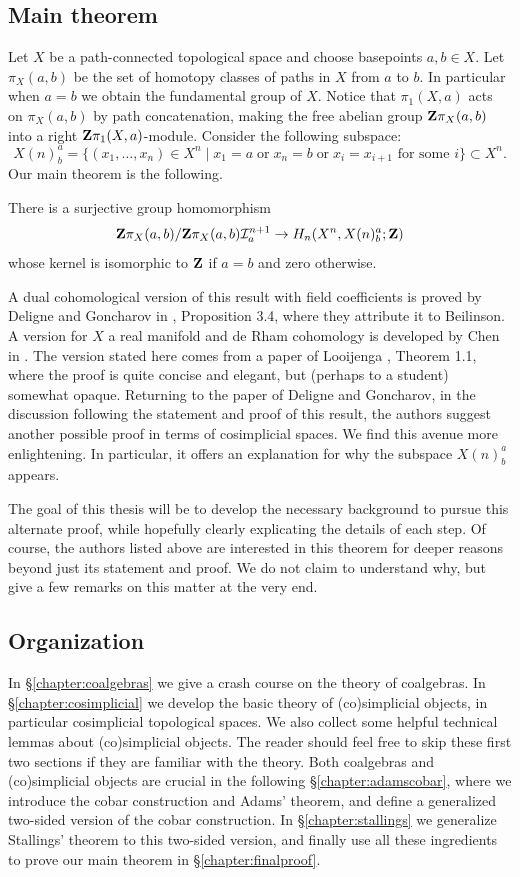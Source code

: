 \subsection{Main theorem}
Let $X$ be a path-connected topological space and choose basepoints $a, b \in X$. Let $\pi_X(a,b)$ be the set of homotopy classes of paths in $X$ from $a$ to $b$. In particular when $a=b$ we obtain the fundamental group of $X$. Notice that $\pi_1(X,a)$ acts on $\pi_X(a,b)$ by path concatenation, making the free abelian group $\mathbf{Z}\pi_X(a,b)$ into a right $\mathbf{Z}\pi_1(X,a)$-module. Consider the following subspace:
\[X(n)^a_b = \{ (x_1,\dots,x_n) \in X^n \mid x_1 = a \;\text{or}\; x_n = b \;\text{or}\; x_i = x_{i+1} \text{ for some } i \} \subset X^n.\]
Our main theorem is the following.
\begin{thm}\label{thm:looijenga}
There is a surjective group homomorphism 
\[\mathbf{Z}\pi_X(a,b)/ \mathbf{Z}\pi_X(a,b)\mathcal{I}^{n+1}_a\to H_n(X^n, X(n)^a_b; \mathbf{Z})\]
whose kernel is isomorphic to $\mathbf{Z}$ if $a=b$ and zero otherwise.
\end{thm}
A dual cohomological version of this result with field coefficients is proved by Deligne and Goncharov in \cite{DELIGNE2005}, Proposition 3.4, where they attribute it to Beilinson. A version for $X$ a real manifold and de Rham cohomology is developed by Chen in \cite{Chen1973}. The version stated here comes from a paper of Looijenga \cite{Looijenga2025}, Theorem 1.1, where the proof is quite concise and elegant, but (perhaps to a student) somewhat opaque. Returning to the paper of Deligne and Goncharov, in the discussion following the statement and proof of this result, the authors suggest another possible proof in terms of cosimplicial spaces. We find this avenue more enlightening. In particular, it offers an explanation for why the subspace $X(n)^a_b$ appears. 

The goal of this thesis will be to develop the necessary background to pursue this alternate proof, while hopefully clearly explicating the details of each step. Of course, the authors listed above are interested in this theorem for deeper reasons beyond just its statement and proof. We do not claim to understand why, but give a few remarks on this matter at the very end.

\subsection{Organization} In \S\ref{chapter:coalgebras} we give a crash course on the theory of coalgebras. In \S\ref{chapter:cosimplicial} we develop the basic theory of (co)simplicial objects, in particular cosimplicial topological spaces. We also collect some helpful technical lemmas about (co)simplicial objects. The reader should feel free to skip these first two sections if they are familiar with the theory. Both coalgebras and (co)simplicial objects are crucial in the following \S\ref{chapter:adamscobar}, where we introduce the cobar construction and Adams' theorem, and define a generalized two-sided version of the cobar construction. In \S\ref{chapter:stallings} we generalize Stallings' theorem to this two-sided version, and finally use all these ingredients to prove our main theorem in \S\ref{chapter:finalproof}.

